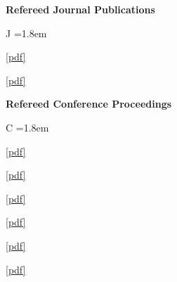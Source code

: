 \documentclass[]{res}
\begin{document}
\begin{resume}
{\bf Refereed Journal Publications}
\begin{list}{J}
  {\leftmargin=1.8em}
  \item {} \href{https://arxiv.org/pdf/2501.05302}{[pdf]}
  \item {} \href{https://doi.org/10.1038/s44459-026-00075-6}{[pdf]}
  \item {}
\end{list}

{\bf Refereed Conference Proceedings}
\begin{list}{C}
  {\leftmargin=1.8em}
  \item {} \href{https://radionavlab.ae.utexas.edu/wp-content/uploads/komodromos_starlink_simulator.pdf}{[pdf]}
  \item {} \href{https://radionavlab.ae.utexas.edu/wp-content/uploads/qin_agile_antenna.pdf}{[pdf]}
  \item {}
  \item {} \href{https://radionavlab.ae.utexas.edu/wp-content/uploads/Qin_analysis_of_short_term_time_stability_starlink_frame_clock.pdf}{[pdf]}
  \item {} \href{https://radionavlab.ae.utexas.edu/wp-content/uploads/morgan_MockStarlink_plans.pdf}{[pdf]}
  \item {} \href{https://radionavlab.ae.utexas.edu/wp-content/uploads/komodromos2025_network_aided_plans.pdf}{[pdf]}
  \item {} \href{https://radionavlab.ae.utexas.edu/wp-content/uploads/komodromos_starlink_simulator.pdf}{[pdf]}
\end{list}




\end{resume}
\end{document}
